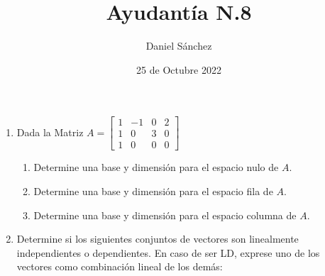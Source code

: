 \documentclass[12pt]{article}
\begin{document}
\title{Ayudant\'ia N.8}
\date{25 de Octubre 2022}
\author{Daniel S\'anchez}
\maketitle

\begin{enumerate}
    \item Dada la Matriz $A=
              \begin{bmatrix}
                  1 & -1 & 0 & 2 \\
                  1 & 0  & 3 & 0 \\
                  1 & 0  & 0 & 0
              \end{bmatrix}$
          \begin{enumerate}
              \item Determine una base y dimensi\'on para el espacio nulo de $A$.
              \item Determine una base y dimensi\'on para el espacio fila de $A$.
              \item Determine una base y dimensi\'on para el espacio columna de $A$.
          \end{enumerate}
    \item Determine si los siguientes conjuntos de vectores son linealmente independientes o
          dependientes. En caso de ser LD, exprese uno de los vectores como combinaci\'on lineal de los dem\'as:
\end{enumerate}
\end{document}
